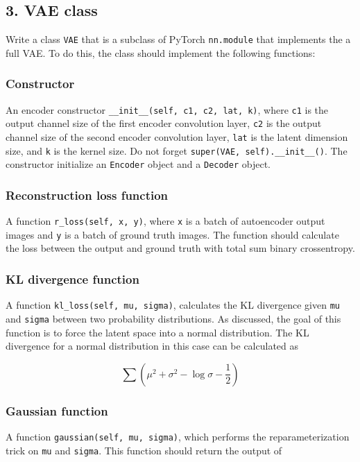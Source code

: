 \documentclass{article}
\begin{document}
\subsection*{3. VAE class}
Write a class \texttt{VAE} that is a subclass of PyTorch \texttt{nn.module} that implements the a full VAE. To do this, the class should implement the following functions:
\subsubsection*{Constructor}
An encoder constructor \texttt{\_\_init\_\_(self, c1, c2, lat, k)}, where \texttt{c1} is the output channel size of the first encoder convolution layer, \texttt{c2} is the output channel size of the second encoder convolution layer, \texttt{lat} is the latent dimension size, and \texttt{k} is the kernel size. Do not forget \texttt{super(VAE, self).\_\_init\_\_()}. The constructor initialize an \texttt{Encoder} object and a \texttt{Decoder} object.

\subsubsection*{Reconstruction loss function}
A function \texttt{r\_loss(self, x, y)}, where \texttt{x} is a batch of autoencoder output images and  \texttt{y} is a batch of ground truth images. The function should calculate the loss between the output and ground truth with total sum binary crossentropy.

\subsubsection*{KL divergence function}
A function \texttt{kl\_loss(self, mu, sigma)}, calculates the KL divergence given \texttt{mu} and \texttt{sigma} between two probability distributions. As discussed, the goal of this function is to force the latent space into a normal distribution. The KL divergence for a normal distribution in this case can be calculated as

\[\sum (\mu ^ 2 + \sigma ^ 2 - \log\sigma - \frac{1}{2})\]

\subsubsection*{Gaussian function}
A function \texttt{gaussian(self, mu, sigma)}, which performs the reparameterization trick on \texttt{mu} and \texttt{sigma}. This function should return the output of 
\end{document}
